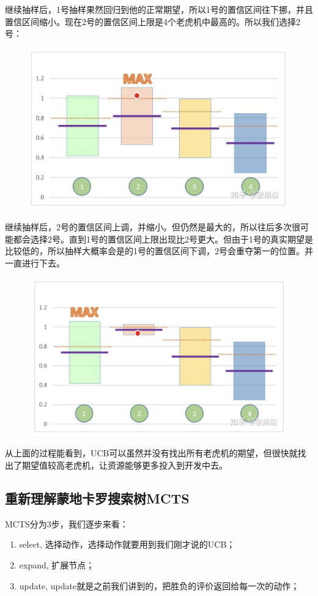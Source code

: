 \documentclass[12pt]{article}
\begin{document}
继续抽样后，1号抽样果然回归到他的正常期望，所以1号的置信区间往下挪，并且置信区间缩小。现在2号的置信区间上限是4个老虎机中最高的。所以我们选择2号：
\begin{figure}[H]
    \centering
    \includegraphics[width=.6\textwidth]{fig/ReinforcementLearning/AlphaZero_UCB_Confidence_Interval_5.png}
\end{figure}

继续抽样后，2号的置信区间上调，并缩小。但仍然是最大的，所以往后多次很可能都会选择2号。直到1号的置信区间上限出现比2号更大。但由于1号的真实期望是比较低的，所以抽样大概率会是的1号的置信区间下调，2号会重夺第一的位置。并一直进行下去。
\begin{figure}[H]
    \centering
    \includegraphics[width=.6\textwidth]{fig/ReinforcementLearning/AlphaZero_UCB_Confidence_Interval_6.png}
\end{figure}

从上面的过程能看到，UCB可以虽然并没有找出所有老虎机的期望，但很快就找出了期望值较高老虎机，让资源能够更多投入到开发中去。

\subsection{重新理解蒙地卡罗搜索树MCTS}
MCTS分为3步，我们逐步来看：
\begin{enumerate}
\setlength{\itemsep}{0pt}
\setlength{\parsep}{0pt}
\setlength{\parskip}{0pt}
    \item select, 选择动作，选择动作就要用到我们刚才说的UCB；
    \item expand, 扩展节点；
    \item update, update就是之前我们讲到的，把胜负的评价返回给每一次的动作；
\end{enumerate}
\end{document}
